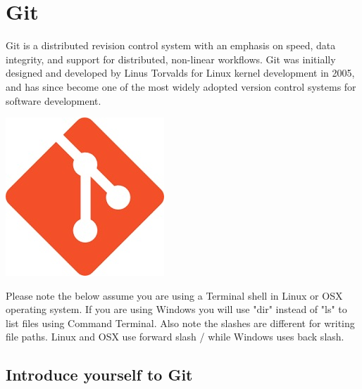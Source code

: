 \chapter{Git}
Git is a distributed revision control system with an emphasis on speed, data integrity, and support for distributed, non-linear workflows.  Git was initially designed and developed by Linus Torvalds for Linux kernel development in 2005, and has since become one of the most widely adopted version control systems for software development.

\begin{marginfigure}%
  \includegraphics[width=\linewidth]{download.jpg}
  \label{fig:marginfig}
\end{marginfigure}
Please note the below assume you are using a Terminal shell in Linux or OSX operating system. If you are using Windows you will use "dir" instead of "ls" to list files using Command Terminal. Also note the slashes are different for writing file paths. Linux and OSX use forward slash / while Windows uses back slash.

\vspace{1cm}

\section{Introduce yourself to Git}


